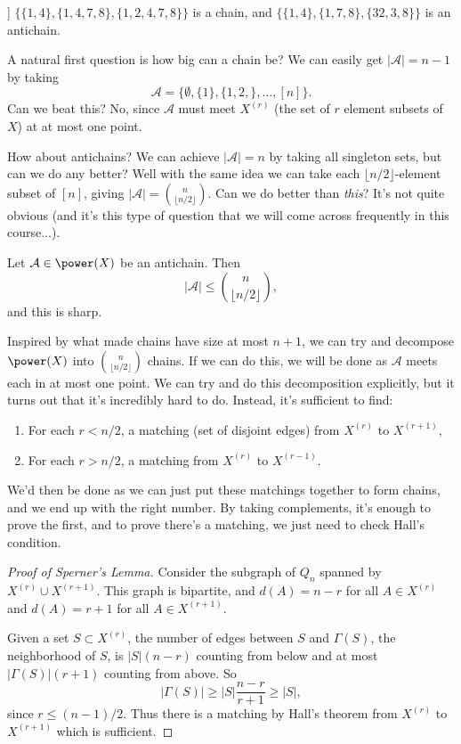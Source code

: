 \documentclass[a4paper]{scrartcl}
\newcommand{\A}{\mathcal{A}}
\begin{document}
\begin{example}]
    $\{\{1, 4\}, \{1, 4, 7, 8\}, \{1, 2, 4, 7, 8\}\}$ is a chain, and  $\{\{1, 4\}, \{1, 7, 8\}, \{32, 3, 8\}\}$ is an antichain.
\end{example}

A natural first question is how big can a chain be? We can easily get $|\A| = n - 1$ by taking
$$
\A = \{\emptyset, \{1\}, \{1, 2, \}, \dots, [n]\}.
$$
Can we beat this? No, since $\A$ must meet $X^{(r)}$ (the set of $r$ element subsets of $X$) at at most one point.

How about antichains? We can achieve $|\A| = n$ by taking all singleton sets, but can we do any better? Well with the same idea we can take each $\lfloor n/2\rfloor$-element subset of $[n]$, giving $|\A| = \binom{n}{\lfloor n/2\rfloor}$. Can we do better than \emph{this}? It's not quite obvious (and it's this type of question that we will come across frequently in this course...).

\begin{theorem}\label{sperner}
    Let $\A \in \power(X)$ be an antichain. Then
    $$
    |\A| \leq \binom{n}{\lfloor n/2 \rfloor},
    $$
    and this is sharp.
\end{theorem}

Inspired by what made chains have size at most $n + 1$, we can try and decompose $\power (X)$ into $\binom{n}{\lfloor n/2 \rfloor}$ chains. If we can do this, we will be done as $\A$ meets each in at most one point.
We can try and do this decomposition explicitly, but it turns out that it's incredibly hard to do. 
Instead, it's sufficient to find:

\begin{enumerate}
    \item For each $r < n/2$, a matching (set of disjoint edges) from $X^{(r)}$ to $X^{(r + 1)}$,
    \item For each $r > n/2$, a matching from $X^{(r)}$ to $X^{(r - 1)}$.
\end{enumerate}
We'd then be done as we can just put these matchings together to form chains, and we end up with the right number. By taking complements, it's enough to prove the first, and to prove there's a matching, we just need to check Hall's condition.

\begin{proof}[Proof of Sperner's Lemma]
    Consider the subgraph of $Q_n$ spanned by $X^{(r)}\cup X^{(r + 1)}$. This graph is bipartite, and $d(A) = n - r$ for all $A \in X^{(r)}$ and $d(A) = r + 1$ for all $A \in X^{(r + 1)}$.

    Given a set $S \subset X^{(r)}$, the number of edges between $S$ and $\Gamma(S)$, the neighborhood of $S$, is
    $|S|(n - r)$ counting from below and at most $|\Gamma(S)|(r + 1)$ counting from above. So
    $$
    |\Gamma(S)| \geq |S| \frac{n - r}{r + 1} \geq |S|,
    $$
    since $r \leq (n - 1)/2$. Thus there is a matching by Hall's theorem from $X^{(r)}$ to $X^{(r + 1)}$ which is sufficient.
\end{proof}
\end{document}
